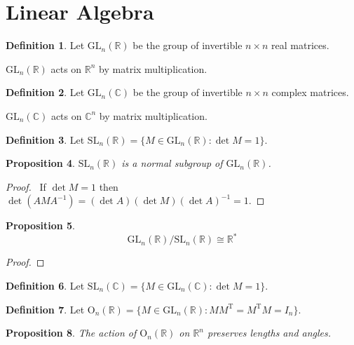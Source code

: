 \documentclass{book}
\let\qed\relax
\newtheorem{prop}{Proposition}[chapter]
\theoremstyle{definition}
\newtheorem{df}[prop]{Definition}
\begin{document}
\part{Linear Algebra}

\begin{df}
    Let $\mathrm{GL}_n(\mathbb{R})$ be the group of invertible $n \times n$ real matrices.
    
    $\mathrm{GL}_n(\mathbb{R})$ acts on $\mathbb{R}^n$ by matrix multiplication.
\end{df}

\begin{df}
    Let $\mathrm{GL}_n(\mathbb{C})$ be the group of invertible $n \times n$ complex matrices.
    
    $\mathrm{GL}_n(\mathbb{C})$ acts on $\mathbb{C}^n$ by matrix multiplication.
\end{df}

\begin{df}
Let $\mathrm{SL}_n(\mathbb{R}) = \{ M \in \mathrm{GL}_n(\mathbb{R}) : \det M = 1 \}$.
\end{df}

\begin{prop}
$\mathrm{SL}_n(\mathbb{R})$ is a normal subgroup of $\mathrm{GL}_n(\mathbb{R})$.
\end{prop}

\begin{proof}
\pf\ If $\det M = 1$ then $\det(AMA^{-1}) = (\det A) (\det M) (\det A)^{-1} = 1$. \qed
\end{proof}

\begin{prop}
\[ \mathrm{GL}_n(\mathbb{R}) / \mathrm{SL}_n(\mathbb{R}) \cong \mathbb{R}^* \]
\end{prop}

\begin{proof}
\end{proof}

\begin{df}
Let $\mathrm{SL}_n(\mathbb{C}) = \{ M \in \mathrm{GL}_n(\mathbb{C}) : \det M = 1 \}$.
\end{df}

\begin{df}
Let $\mathrm{O}_n(\mathbb{R}) = \{ M \in \mathrm{GL}_n(\mathbb{R}) : M M^\mathrm{T} = M^\mathrm{T} M = I_n \}$.
\end{df}

\begin{prop}
The action of $\mathrm{O}_n(\mathbb{R})$ on $\mathbb{R}^n$ preserves lengths and angles.
\end{prop}
\end{document}
